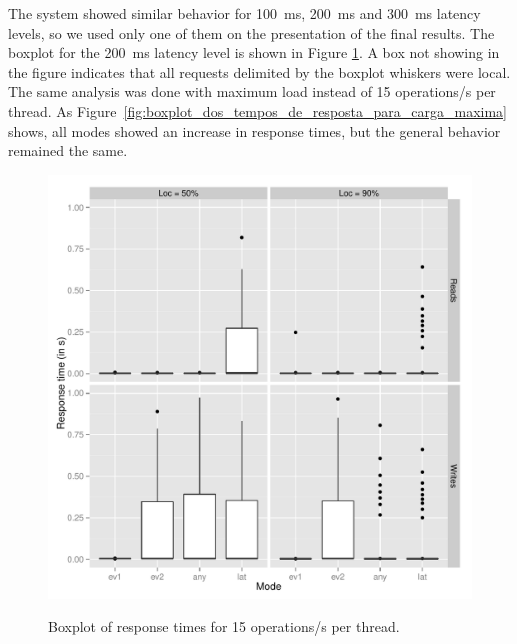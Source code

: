 \documentclass[doublespacing]{bmcart}
\begin{document}
The system showed similar behavior for 100~ms, 200~ms and 300~ms latency
levels, so we used only one of them on the presentation of the final results.
The boxplot for the 200~ms latency level is shown in Figure
\ref{fig:boxplot_dos_tempos_de_resposta}. A box not showing in the figure
indicates that all requests delimited by the boxplot whiskers were local. The
same analysis was done with maximum load instead of 15 operations/s per thread.
As Figure~\ref{fig:boxplot_dos_tempos_de_resposta_para_carga_maxima} shows, all
modes showed an increase in response times, but the general behavior remained
the same.

\begin{figure}[h!]
\caption{Boxplot of response times for 15 operations/s per thread.}
\includegraphics[width=1.0\textwidth]{boxplot200.png}
\label{fig:boxplot_dos_tempos_de_resposta}
\end{figure}
\end{document}
